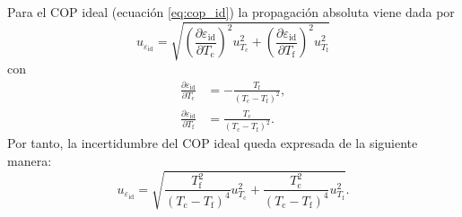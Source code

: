 \documentclass[a4paper,11pt]{article}
\begin{document}
Para el COP ideal (ecuación \ref{eq:cop_id}) la propagación absoluta viene dada por
\begin{equation}
u_{\varepsilon_{\mathrm{id}}}=\sqrt{\left(\frac{\partial\varepsilon_{\mathrm{id}}}{\partial T_{\mathrm{c}}}\right)^2 u_{T_{\mathrm{c}}}^2
 +\left(\frac{\partial\varepsilon_{\mathrm{id}}}{\partial T_{\mathrm{f}}}\right)^2 u_{T_{\mathrm{f}}}^2}
\end{equation}
con
\begin{align}
\frac{\partial\varepsilon_{\mathrm{id}}}{\partial T_{\mathrm{c}}}&=-\frac{T_{\mathrm{f}}}{(T_{\mathrm{c}}-T_{\mathrm{f}})^2},\\
\frac{\partial\varepsilon_{\mathrm{id}}}{\partial T_{\mathrm{f}}}&=\frac{T_{\mathrm{c}}}{(T_{\mathrm{c}}-T_{\mathrm{f}})^2}.
\end{align}
Por tanto, la incertidumbre del COP ideal queda expresada de la siguiente manera:
\begin{equation}
u_{\varepsilon_{\mathrm{id}}}=\sqrt{\frac{T_{\mathrm{f}}^2}{(T_{\mathrm{c}}-T_{\mathrm{f}})^4}u_{T_{\mathrm{c}}}^2
 +\frac{T_{\mathrm{c}}^2}{(T_{\mathrm{c}}-T_{\mathrm{f}})^4}u_{T_{\mathrm{f}}}^2 }.
\label{eq:unc_id}
\end{equation}

\end{document}
